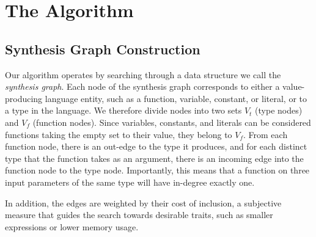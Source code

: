 \section{The Algorithm}
\label{sec:algorithm}
\subsection{Synthesis Graph Construction}
\label{sec:algorithm:graph}

Our algorithm operates by searching through a data structure we call the {\emph{synthesis graph}}. Each node of the synthesis graph corresponds to either a value-producing language entity, such as a function, variable, constant, or literal, or to a type in the language. We therefore divide nodes into two sets $V_t$ (type nodes) and $V_f$ (function nodes). Since variables, constants, and literals can be considered functions taking the empty set to their value, they belong to $V_f$. From each function node, there is an out-edge to the type it produces, and for each distinct type that the function takes as an argument, there is an incoming edge into the function node to the type node. Importantly, this means that a function on three input parameters of the same type will have in-degree exactly one.

In addition, the edges are weighted by their cost of inclusion, a subjective measure that guides the search towards desirable traits, such as smaller expressions or lower memory usage.


